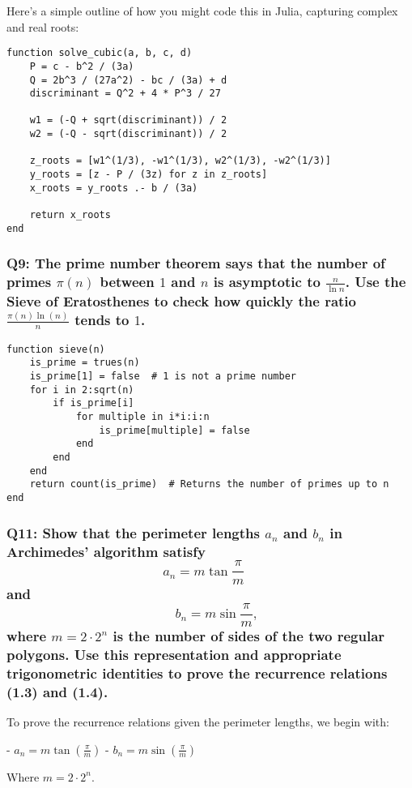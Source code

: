 \documentclass[8pt]{article}
\begin{document}
Here’s a simple outline of how you might code this in Julia, capturing complex and real roots:

\begin{verbatim}
function solve_cubic(a, b, c, d)
    P = c - b^2 / (3a)
    Q = 2b^3 / (27a^2) - bc / (3a) + d
    discriminant = Q^2 + 4 * P^3 / 27

    w1 = (-Q + sqrt(discriminant)) / 2
    w2 = (-Q - sqrt(discriminant)) / 2

    z_roots = [w1^(1/3), -w1^(1/3), w2^(1/3), -w2^(1/3)]
    y_roots = [z - P / (3z) for z in z_roots]
    x_roots = y_roots .- b / (3a)

    return x_roots
end
\end{verbatim}

\subsubsection*{Q9: The prime number theorem says that the number of primes $\pi(n)$ between $1$ and $n$ is asymptotic to $\frac{n}{\ln n}$. Use the Sieve of Eratosthenes to check how quickly the ratio $\frac{\pi(n) \ln(n)}{n}$ tends to $1$.}

\begin{verbatim}
function sieve(n)
    is_prime = trues(n)
    is_prime[1] = false  # 1 is not a prime number
    for i in 2:sqrt(n)
        if is_prime[i]
            for multiple in i*i:i:n
                is_prime[multiple] = false
            end
        end
    end
    return count(is_prime)  # Returns the number of primes up to n
end
\end{verbatim}

\subsubsection*{Q11: Show that the perimeter lengths $a_n$ and $b_n$ in Archimedes’ algorithm satisfy
\[ a_n = m \tan \frac{\pi}{m} \quad\] and\[\quad b_n = m \sin \frac{\pi}{m}, \]
where \( m = 2 \cdot 2^n \) is the number of sides of the two regular polygons. Use this representation and appropriate trigonometric identities to prove the recurrence relations (1.3) and (1.4).}

To prove the recurrence relations given the perimeter lengths, we begin with:

- \( a_n = m \tan \left( \frac{\pi}{m} \right) \)
- \( b_n = m \sin \left( \frac{\pi}{m} \right) \)

Where \( m = 2 \cdot 2^n \).
\end{document}
